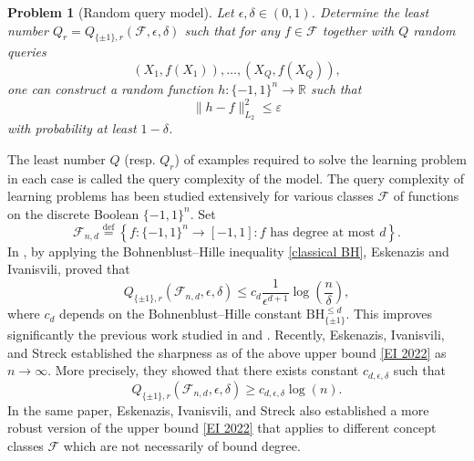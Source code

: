 \documentclass{amsbook}
\newtheorem{problem}[theorem]{Problem}
\theoremstyle{definition}
\theoremstyle{remark}
\numberwithin{section}{chapter}
\numberwithin{equation}{chapter}
\newcommand{\1}{\mathbf{1}}
\begin{document}
\begin{problem}[Random query model]
 Let $\epsilon,\delta\in (0,1)$.  Determine  the least number $Q_r=Q_{\{\pm1\},r}(\mathcal{F},\epsilon,\delta)$ such that for any $f\in \mathcal{F}$ together with $Q$ random queries
$$(X_1, f(X_1)), \dots, (X_Q, f(X_Q)),$$
 one can construct a random function $h: \{-1,1\}^n \to \mathbb{R}$ such that 
$$\|h - f\|_{L_2}^2 \leq \varepsilon$$
with probability at least $1-\delta$. 
\end{problem}
The least number $Q$ (resp. $Q_r$) of examples required to solve the learning problem in each case is called the query complexity of the  model. The query complexity of learning problems has been studied extensively for various classes $\mathcal{F}$ of functions on the discrete Boolean $\{-1,1\}^n$.  Set
\begin{equation}\label{Fnd}
\mathcal{F}_{n,d} \stackrel{\text{def}}{=} \left\{ f : \{-1,1\}^n \to [-1,1] : f \text{ has degree at most } d \right\} .
\end{equation}
In \cite{EI2022}, by  applying the  Bohnenblust--Hille inequality \eqref{classical BH}, Eskenazis and Ivanisvili,  proved that 
\begin{equation}\label{EI 2022}
Q_{\{\pm1\},r}(\mathcal{F}_{n,d},\epsilon,\delta)\leq c_d \frac{1}{\epsilon^{d+1}} \log\left(\frac{n}{\delta}\right),
\end{equation}
where $c_d$ depends on the Bohnenblust--Hille constant $\text{BH}_{\{\pm1\}}^{\leq d}$. This improves significantly the previous work studied in \cite{LMN1993} and \cite{IRRRY2021}. Recently, Eskenazis, Ivanisvili, and Streck \cite{EIS2023} established the sharpness as of the above upper bound \eqref{EI 2022} as $n\to \infty$. More precisely, they showed that there exists constant $c_{d,\epsilon,\delta} $ such that 
\begin{equation}\label{EIS 2023}
Q_{\{\pm1\},r}(\mathcal{F}_{n,d},\epsilon,\delta)\geq c_{d,\epsilon,\delta}\log(n).
\end{equation}
In the same paper, Eskenazis, Ivanisvili, and Streck \cite{EIS2023} also established a  more robust version of the upper bound \eqref{EI 2022} that applies to different concept classes $\mathcal{F}$ which are not necessarily of bound degree.
\end{document}
